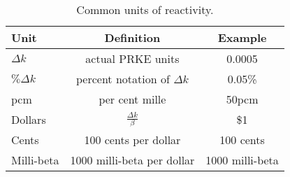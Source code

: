     \begin{table}[h!]
    \centering
      \begin{tabular}{|l|c|c||}
        \hline
        Unit & Definition & Example\\
        \hline
        $\Delta k$ & actual PRKE units & 0.0005 \\
        $\%\Delta k$ & percent notation of $\Delta k$ & 0.05\% \\
        pcm & per cent mille & 50pcm \\
        \hline
        Dollars & $\frac{\Delta k}{\beta}$ & \$1\\
        Cents & 100 cents per dollar & 100 cents\\
        Milli-beta & 1000 milli-beta per dollar& 1000 milli-beta\\
        \hline
      \end{tabular}
      \caption{Common units of reactivity.}
      \label{tab:rho_units}
    \end{table}
